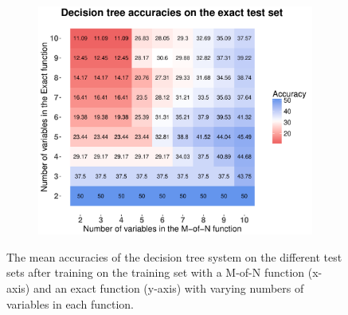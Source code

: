\documentclass[letterpaper]{article} %
\begin{document}
\begin{figure}
   \begin{subfigure}[t]{0.45\textwidth}
        \includegraphics[width = 1 \linewidth]{Figures/Heatmap_ME_DT_E.pdf}
		\caption{}       
        \label{fig:Heatmap_ME_DT_E}
    \end{subfigure}%
    \caption{The mean accuracies of the decision tree system on the different test sets after training on the training set with a M-of-N function (x-axis) and an exact function (y-axis) with varying numbers of variables in each function.}
    \label{fig:Heatmap_DT_ME}
\end{figure}
\end{document}
